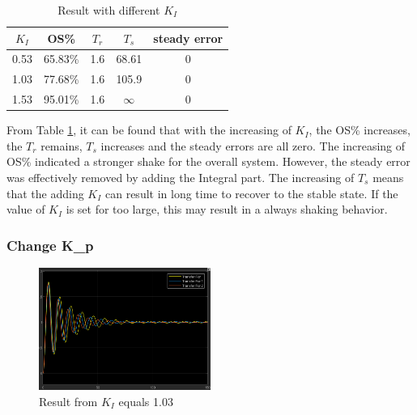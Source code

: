 \documentclass[11pt, a4paper]{article}
\begin{document}
\begin{table}[htbp]
\caption{Result with different $K_{I}$}
\label{tab:resp_3_1}
\begin{center}
\begin{tabular}{c||cccc}
\hline
$K_{I}$   &    OS\%      & $T_{r}$       & $T_{s}$   &  steady error \\
\hline
0.53  &   65.83\%         & 1.6          &  68.61     &  0     \\
1.03  &   77.68\%         & 1.6          &  105.9     &  0     \\
1.53  &   95.01\%         & 1.6          &  $\infty$     &  0     \\
\hline
\end{tabular}
\end{center}
\end{table}


From Table \ref{tab:resp_3_1}, it can be found that with the increasing of $K_{I}$, the OS\% increases, the $T_{r}$ remains, $T_{s}$ increases and the steady errors are all zero. The increasing of OS\% indicated a stronger shake for the overall system. However, the steady error was effectively removed by adding the Integral part. The increasing of $T_{s}$ means that the adding $K_{I}$ can result in long time to recover to the stable state. If the value of $K_{I}$ is set for too large, this may result in a always shaking behavior.


\subsubsection{Change K_{p}}


\begin{figure}[htbp]     \begin{centering}
    \includegraphics[width=0.5\textwidth]{3_2.png}
    \caption{\label{Fig:p3_2}Result from $K_{I}$ equals 1.03}
    \end{centering}
    
\end{figure}
\end{document}
